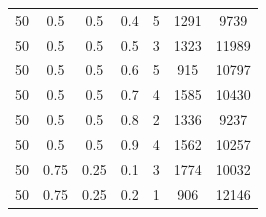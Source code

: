 \documentclass[a4paper,oneside,14pt]{extreport}
\begin{document}
\begin{table}[H]
\begin{center}
\begin{tabular}{|c|c|c|c|c|c|c|}
		50 & 0.5 & 0.5 & 0.4 & 5 & 1291 & 9739 \\
		50 & 0.5 & 0.5 & 0.5 & 3 & 1323 & 11989 \\
		50 & 0.5 & 0.5 & 0.6 & 5 & 915 & 10797 \\
		50 & 0.5 & 0.5 & 0.7 & 4 & 1585 & 10430 \\
		50 & 0.5 & 0.5 & 0.8 & 2 & 1336 & 9237 \\
		50 & 0.5 & 0.5 & 0.9 & 4 & 1562 & 10257 \\
		50 & 0.75 & 0.25 & 0.1 & 3 & 1774 & 10032 \\
		50 & 0.75 & 0.25 & 0.2 & 1 & 906 & 12146 \\
		 \hline
	\end{tabular}
\end{center}
\end{table}
\newpage 
\end{document}
